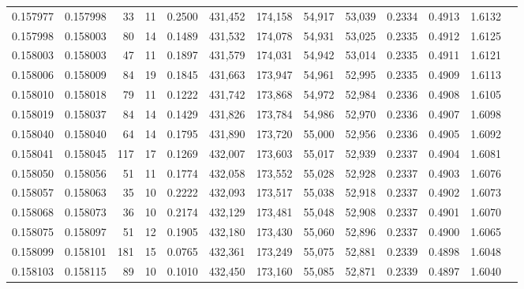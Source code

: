 \begin{tabular}{rrrrrrrrrrrrr}
0.157977 & 0.157998 &    33 &  11 &                                     0.2500 & 431,452 & 174,158 &  54,917 &  53,039 & 0.2334 & 0.4913 & 1.6132 \\
0.157998 & 0.158003 &    80 &  14 &                                     0.1489 & 431,532 & 174,078 &  54,931 &  53,025 & 0.2335 & 0.4912 & 1.6125 \\
0.158003 & 0.158003 &    47 &  11 &                                     0.1897 & 431,579 & 174,031 &  54,942 &  53,014 & 0.2335 & 0.4911 & 1.6121 \\
0.158006 & 0.158009 &    84 &  19 &                                     0.1845 & 431,663 & 173,947 &  54,961 &  52,995 & 0.2335 & 0.4909 & 1.6113 \\
0.158010 & 0.158018 &    79 &  11 &                                     0.1222 & 431,742 & 173,868 &  54,972 &  52,984 & 0.2336 & 0.4908 & 1.6105 \\
0.158019 & 0.158037 &    84 &  14 &                                     0.1429 & 431,826 & 173,784 &  54,986 &  52,970 & 0.2336 & 0.4907 & 1.6098 \\
0.158040 & 0.158040 &    64 &  14 &                                     0.1795 & 431,890 & 173,720 &  55,000 &  52,956 & 0.2336 & 0.4905 & 1.6092 \\
0.158041 & 0.158045 &   117 &  17 &                                     0.1269 & 432,007 & 173,603 &  55,017 &  52,939 & 0.2337 & 0.4904 & 1.6081 \\
0.158050 & 0.158056 &    51 &  11 &                                     0.1774 & 432,058 & 173,552 &  55,028 &  52,928 & 0.2337 & 0.4903 & 1.6076 \\
0.158057 & 0.158063 &    35 &  10 &                                     0.2222 & 432,093 & 173,517 &  55,038 &  52,918 & 0.2337 & 0.4902 & 1.6073 \\
0.158068 & 0.158073 &    36 &  10 &                                     0.2174 & 432,129 & 173,481 &  55,048 &  52,908 & 0.2337 & 0.4901 & 1.6070 \\
0.158075 & 0.158097 &    51 &  12 &                                     0.1905 & 432,180 & 173,430 &  55,060 &  52,896 & 0.2337 & 0.4900 & 1.6065 \\
0.158099 & 0.158101 &   181 &  15 &                                     0.0765 & 432,361 & 173,249 &  55,075 &  52,881 & 0.2339 & 0.4898 & 1.6048 \\
0.158103 & 0.158115 &    89 &  10 &                                     0.1010 & 432,450 & 173,160 &  55,085 &  52,871 & 0.2339 & 0.4897 & 1.6040 \\

\end{tabular}

